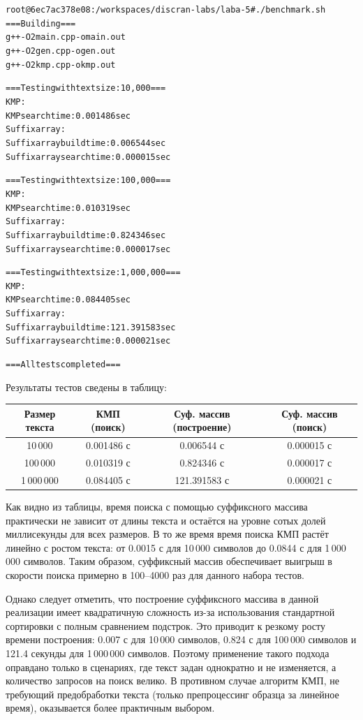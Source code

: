 \begin{alltt}
root@6ec7ac378e08:/workspaces/discran-labs/laba-5# ./benchmark.sh
=== Building ===
g++ -O2 main.cpp -o main.out
g++ -O2 gen.cpp -o gen.out
g++ -O2 kmp.cpp -o kmp.out

=== Testing with text size: 10,000 ===
KMP:
KMP search time: 0.001486 sec
Suffix array:
Suffix array build time: 0.006544 sec
Suffix array search time: 0.000015 sec

=== Testing with text size: 100,000 ===
KMP:
KMP search time: 0.010319 sec
Suffix array:
Suffix array build time: 0.824346 sec
Suffix array search time: 0.000017 sec

=== Testing with text size: 1,000,000 ===
KMP:
KMP search time: 0.084405 sec
Suffix array:
Suffix array build time: 121.391583 sec
Suffix array search time: 0.000021 sec

=== All tests completed ===
\end{alltt}

\noindent Результаты тестов сведены в таблицу:

\begin{center}
\begin{tabular}{|c|c|c|c|}
\hline
\textbf{Размер текста} & \textbf{КМП (поиск)} & \textbf{Суф. массив (построение)} & \textbf{Суф. массив (поиск)} \\
\hline
10\,000 & 0.001486 с & 0.006544 с & 0.000015 с \\
\hline
100\,000 & 0.010319 с & 0.824346 с & 0.000017 с \\
\hline
1\,000\,000 & 0.084405 с & 121.391583 с & 0.000021 с \\
\hline
\end{tabular}
\end{center}

Как видно из таблицы, время поиска с помощью суффиксного массива практически не зависит от длины текста и остаётся на уровне сотых долей миллисекунды для всех размеров. В то же время время поиска КМП растёт линейно с ростом текста: от 0.0015 с для 10\,000 символов до 0.0844 с для 1\,000\,000 символов. Таким образом, суффиксный массив обеспечивает выигрыш в скорости поиска примерно в 100--4000 раз для данного набора тестов.

Однако следует отметить, что построение суффиксного массива в данной реализации имеет квадратичную сложность из-за использования стандартной сортировки с полным сравнением подстрок. Это приводит к резкому росту времени построения: 0.007 с для 10\,000 символов, 0.824 с для 100\,000 символов и 121.4 секунды для 1\,000\,000 символов. Поэтому применение такого подхода оправдано только в сценариях, где текст задан однократно и не изменяется, а количество запросов на поиск велико. В противном случае алгоритм КМП, не требующий предобработки текста (только препроцессинг образца за линейное время), оказывается более практичным выбором.

\pagebreak